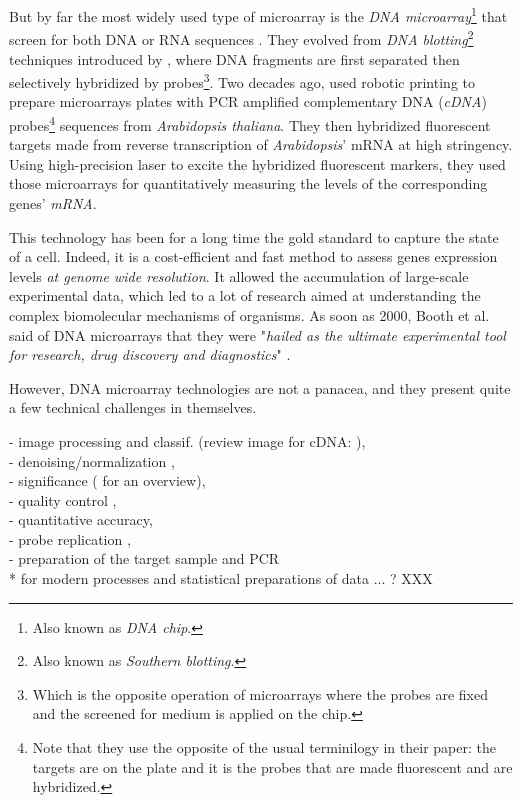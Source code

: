 	But by far the most widely used type of microarray is the \emph{DNA microarray}\footnote{Also known as \emph{DNA chip}.} that screen for both DNA or RNA sequences \parencite{sealfon2011rna}.
	They evolved from \emph{DNA blotting}\footnote{Also known as \emph{Southern blotting}.} techniques introduced by \textcite{southern1975detection}, where DNA fragments are first separated then selectively hybridized by probes\footnote{Which is the opposite operation of microarrays where the probes are fixed and the screened for medium is applied on the chip.}.
	Two decades ago, \textcite{schena1995quantitative} used robotic printing to prepare microarrays plates with PCR amplified complementary DNA (\emph{cDNA}) probes\footnote{\label{ft:invterm}Note that they use the opposite of the usual terminilogy in their paper: the targets are on the plate and it is the probes that are made fluorescent and are hybridized.} sequences from \emph{Arabidopsis thaliana}.
	They then hybridized fluorescent targets made from reverse transcription of \emph{Arabidopsis}' mRNA at high stringency.
	Using high-precision laser to excite the hybridized fluorescent markers, they used those microarrays for quantitatively measuring the levels of the corresponding genes' \emph{mRNA}.

	This technology has been for a long time the gold standard to capture the state of a cell.
	Indeed, it is a cost-efficient and fast method to assess genes expression levels \emph{at genome wide resolution}.
	It allowed the accumulation of large-scale experimental data, which led to a lot of research aimed at understanding the complex biomolecular mechanisms of organisms.
	As soon as 2000, Booth et al. said of DNA microarrays that they were "\emph{hailed as the ultimate experimental tool for research, drug discovery and diagnostics}" \parencite{booth2000application}.

	However, DNA microarray technologies are not a panacea, and they present quite a few technical challenges in themselves.

	- image processing and classif. (review image for cDNA: \parencite{karun2015review}),\\
	- denoising/normalization \parencite{kreil2005tutorial}, \\
	- significance (\parencite{steinhoff2006normalization} for an overview), \\
	- quality control \parencite{wang2001quantitative},\\
	- quantitative accuracy,\\
	- probe replication \parencites{black2002calculation}{smyth2005use},\\
	- preparation of the target sample and PCR \\
	* \textcite{maruyama2014gene} for modern processes and statistical preparations of data
	... ? XXX

